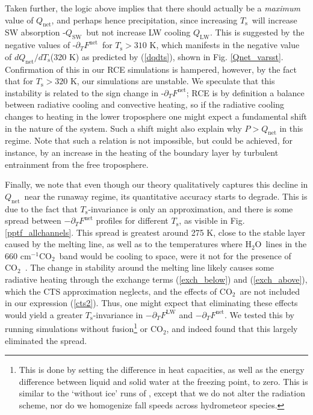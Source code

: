 \documentclass[10pt]{article}
\newcommand{\eqnref}[1]{(\ref{#1})}
\newcommand{\ppt}{\ensuremath{\partial_T}}
\newcommand{\cotwo}{\ensuremath{\mathrm{CO_2}}}
\newcommand{\htwo}{\ensuremath{\mathrm{H_2O}}}
\newcommand{\QLW}{\ensuremath{Q_\mathrm{LW}}}
\newcommand{\QSW}{\ensuremath{Q_\mathrm{SW}}}
\newcommand{\Qnet}{\ensuremath{Q_\mathrm{net}}}
\newcommand{\FLW}{\ensuremath{F^\mathrm{LW}}}
\newcommand{\Fnet}{\ensuremath{F^\mathrm{net}}}
\newcommand{\cminverse}{\ensuremath{\mathrm{cm^{-1}}}}
\newcommand{\Ts}{\ensuremath{T_\mathrm{s}}}
\begin{document}
Taken further, the logic above implies that there should actually be a \emph{maximum} value of \Qnet, and perhaps hence precipitation, since increasing \Ts\ will increase SW absorption -\QSW\ but not increase LW cooling \QLW. This is suggested by the negative values of -\ppt\Fnet\ for $\Ts > 310$ K, which manifests in the negative value of $d\Qnet/d\Ts$(320 K) as predicted by \eqnref{dqdts}, shown in Fig. \ref{Qnet_varsst}. Confirmation of  this in our RCE simulations is hampered, however, by the fact that for $\Ts > 320 $ K, our simulations are unstable. We speculate that this instability is related to the sign change in -\ppt\Fnet; RCE is by definition a balance between radiative cooling and convective heating, so if the radiative cooling changes to heating in the lower troposphere one might expect a fundamental shift in the nature of the system. Such a shift might also explain why $P > \Qnet$ in this regime. Note that such a relation is not impossible, but could be achieved, for instance, by an increase in the heating of the boundary layer by turbulent entrainment from the free troposphere.

Finally, we note that even though our theory qualitatively captures this decline in \Qnet\ near the runaway regime, its quantitative accuracy starts to degrade. This is due to the fact that \Ts-invariance is only an approximation, and there is some spread between $-\ppt \Fnet$ profiles for different \Ts, as visible in Fig. \ref{pptf_allchannels}. This spread is greatest around 275 K, close to the stable layer caused by the melting line, as well as to the temperatures where \htwo\ lines in the 660 \cminverse \cotwo\ band would be cooling to space, were it not for the presence of \cotwo\ \citep[cf. Fig. 1 of][]{huang2013}.  The change in stability around the melting line likely causes some radiative heating through the exchange terms \eqnref{exch_below} and \eqnref{exch_above}, which the CTS approximation neglects, and the effects of \cotwo\ are not included in our expression \eqnref{cts2}. Thus, one might expect that eliminating these effects would yield a greater \Ts-invariance in $-\ppt \FLW$ and $-\ppt \Fnet$. We tested this by running  simulations without fusion\footnote{This is done by setting the difference in heat capacities, as well as the energy difference between liquid and solid water at the freezing point, to zero. This is similar to the `without ice' runs of \cite{seeley2016}, except that we do not alter the radiation scheme, nor do we homogenize fall speeds across hydrometeor species.} or \cotwo, and indeed found that this largely eliminated the spread.
\end{document}
